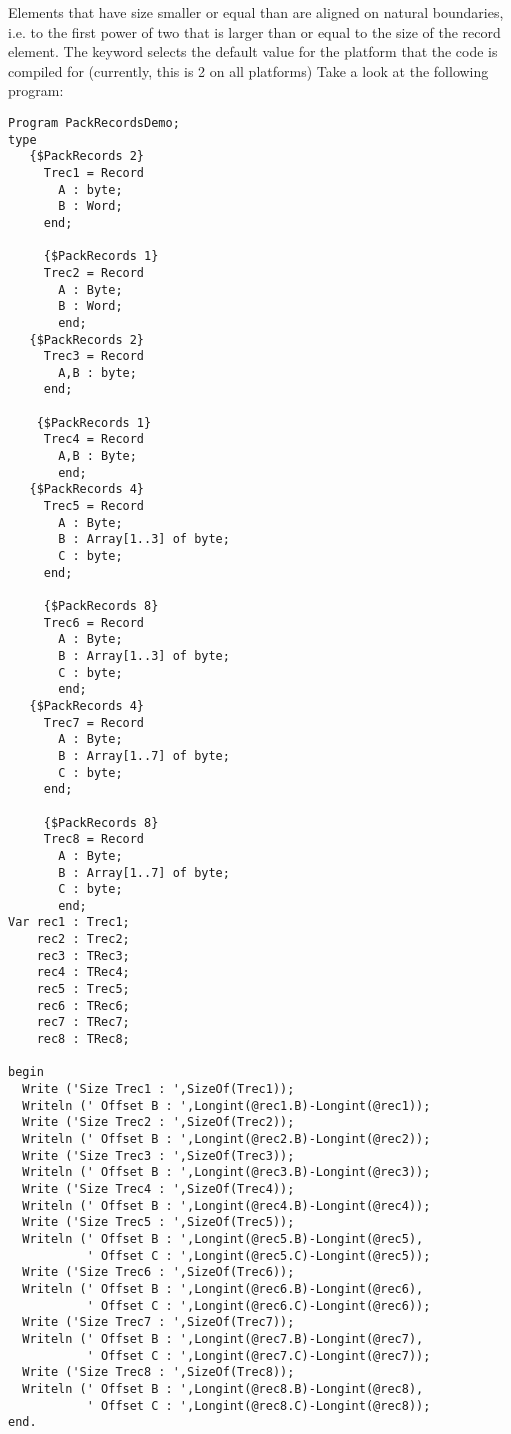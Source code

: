 Elements that have size smaller or equal than  are aligned on
natural boundaries, i.e. to the first power of two that is larger than or
equal to the size of the record element.
The keyword  selects the default value for the platform
that the code is compiled for (currently, this is 2 on all platforms)
Take a look at the following program:
\begin{verbatim}
Program PackRecordsDemo;
type
   {$PackRecords 2}
     Trec1 = Record
       A : byte;
       B : Word;
     end;

     {$PackRecords 1}
     Trec2 = Record
       A : Byte;
       B : Word;
       end;
   {$PackRecords 2}
     Trec3 = Record
       A,B : byte;
     end;

    {$PackRecords 1}
     Trec4 = Record
       A,B : Byte;
       end;
   {$PackRecords 4}
     Trec5 = Record
       A : Byte;
       B : Array[1..3] of byte;
       C : byte;
     end;

     {$PackRecords 8}
     Trec6 = Record
       A : Byte;
       B : Array[1..3] of byte;
       C : byte;
       end;
   {$PackRecords 4}
     Trec7 = Record
       A : Byte;
       B : Array[1..7] of byte;
       C : byte;
     end;

     {$PackRecords 8}
     Trec8 = Record
       A : Byte;
       B : Array[1..7] of byte;
       C : byte;
       end;
Var rec1 : Trec1;
    rec2 : Trec2;
    rec3 : TRec3;
    rec4 : TRec4;
    rec5 : Trec5;
    rec6 : TRec6;
    rec7 : TRec7;
    rec8 : TRec8;

begin
  Write ('Size Trec1 : ',SizeOf(Trec1));
  Writeln (' Offset B : ',Longint(@rec1.B)-Longint(@rec1));
  Write ('Size Trec2 : ',SizeOf(Trec2));
  Writeln (' Offset B : ',Longint(@rec2.B)-Longint(@rec2));
  Write ('Size Trec3 : ',SizeOf(Trec3));
  Writeln (' Offset B : ',Longint(@rec3.B)-Longint(@rec3));
  Write ('Size Trec4 : ',SizeOf(Trec4));
  Writeln (' Offset B : ',Longint(@rec4.B)-Longint(@rec4));
  Write ('Size Trec5 : ',SizeOf(Trec5));
  Writeln (' Offset B : ',Longint(@rec5.B)-Longint(@rec5),
           ' Offset C : ',Longint(@rec5.C)-Longint(@rec5));
  Write ('Size Trec6 : ',SizeOf(Trec6));
  Writeln (' Offset B : ',Longint(@rec6.B)-Longint(@rec6),
           ' Offset C : ',Longint(@rec6.C)-Longint(@rec6));
  Write ('Size Trec7 : ',SizeOf(Trec7));
  Writeln (' Offset B : ',Longint(@rec7.B)-Longint(@rec7),
           ' Offset C : ',Longint(@rec7.C)-Longint(@rec7));
  Write ('Size Trec8 : ',SizeOf(Trec8));
  Writeln (' Offset B : ',Longint(@rec8.B)-Longint(@rec8),
           ' Offset C : ',Longint(@rec8.C)-Longint(@rec8));
end.
\end{verbatim}
